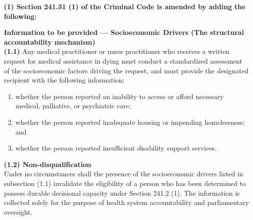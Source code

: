 \documentclass[11pt]{article}
\begin{document}
\textbf{(1) Section 241.31 (1) of the Criminal Code is amended by adding the following:}

\vspace{0.5em}
\noindent \textbf{Information to be provided — Socioeconomic Drivers (The structural accountability mechanism)} \\
\textbf{(1.1)} Any medical practitioner or nurse practitioner who receives a written request for medical assistance in dying must conduct a standardized assessment of the socioeconomic factors driving the request, and must provide the designated recipient with the following information:
\begin{enumerate}
    \item[(a)] whether the person reported an inability to access or afford necessary medical, palliative, or psychiatric care;
    \item[(b)] whether the person reported inadequate housing or impending homelessness; and
    \item[(c)] whether the person reported insufficient disability support services.
\end{enumerate}

\noindent \textbf{(1.2) Non-disqualification} \\
Under no circumstances shall the presence of the socioeconomic drivers listed in subsection (1.1) invalidate the eligibility of a person who has been determined to possess durable decisional capacity under Section 241.2 (1). The information is collected solely for the purpose of health system accountability and parliamentary oversight.
\end{document}
